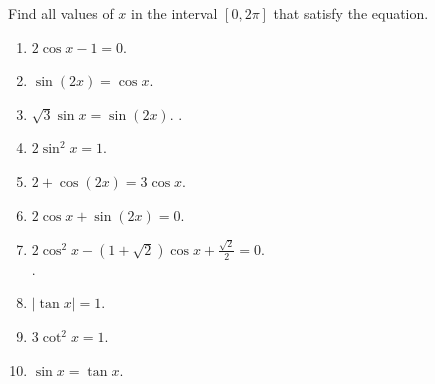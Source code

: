 Find all values of $x$ in the interval $[0,2\pi]$ that satisfy the equation.
\begin{multicols}{2}
\begin{enumerate}
\item $2\cos x - 1=0$. \\  
\item $\sin (2x) = \cos x $.  \\ 
\item $\sqrt {3} \sin x= \sin (2x)$.  .
\item $2\sin^2 x= 1$. \\ 
\item $2+\cos (2x) = 3 \cos x$. \\ 
\item $2\cos x +\sin (2x)=0$.\\ 
\item \label{problemSolve2cos^2x-(1+sqrt(2))cosx+sqrt(2)/2=0} $\displaystyle 2\cos^{2}x-(1+\sqrt{2})\cos x+\frac{\sqrt{2}}{2}=0$. \\ .
\item $|\tan x|=1 $. \\ 
\item $3\cot^2 x= 1$. \\ 
\item $\sin x =\tan x$. \\ 
\end{enumerate}
\end{multicols}
